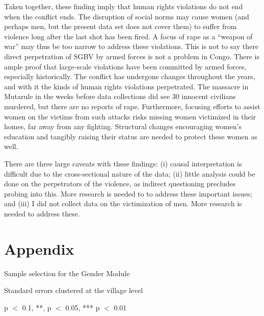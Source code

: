 Taken together, these finding imply that human rights violations do not end when the conflict ends. The disruption of social norms may cause women (and perhaps men, but the present data set does not cover them) to suffer from violence long after the last shot has been fired. A focus of rape as a ``weapon of war'' may thus be too narrow to address these violations. This is not to say there direct perpetration of SGBV by armed forces is not a problem in Congo. There is ample proof that large-scale violations have been committed by armed forces, especially historically. The conflict has undergone changes throughout the years, and with it the kinds of human rights violations perpetrated. The massacre in Mutarule in the weeks before data collections did see 30 innocent civilians murdered, but there are no reports of rape. Furthermore, focusing efforts to assist women on the victims from such attacks risks missing women victimized in their homes, far away from any fighting. Structural changes encouraging women's education and tangibly raising their status are needed to protect these women as well. 

There are three large caveats with these findings: (i) causal interpretation is difficult due to the cross-sectional nature of the data; (ii) little analysis could be done on the perpetrators of the violence, as indirect questioning precludes probing into this. More research is needed to  to address these important issues; and (iii) I did not  collect data on the victimization of men. More research is needed to address these.

\section{Appendix}
\setcounter{table}{0}
\renewcommand{\thetable}{\arabic{chapter}.A\arabic{table}}
\begin{threeparttable}[htb]
	\scriptsize
	\caption{Sample selection for the Gender Module}\label{tab:sample_selection}
	\begin{center}
	
	\begin{tablenotes}
	 \item Standard errors clustered at the village level
	 \item * p $<$ 0.1, **, p $<$ 0.05, *** p $<$ 0.01
	\end{tablenotes}
	\end{center}
\end{threeparttable}

